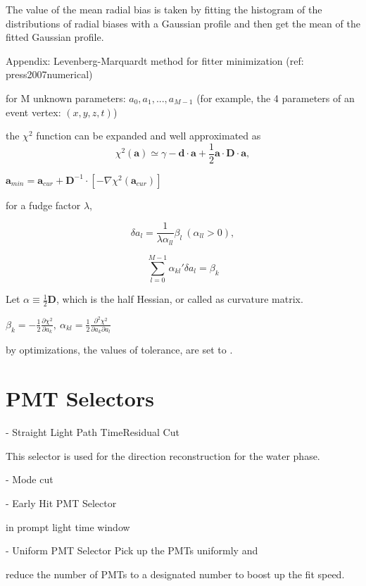 The value of the mean radial bias is taken by fitting the histogram of the distributions of radial biases with a Gaussian profile and then get the mean of the fitted Gaussian profile.







Appendix: Levenberg-Marquardt method for fitter minimization
(ref: press2007numerical)

for M unknown parameters: $a_0, a_1, ... , a_{M-1}$ (for example, the 4 parameters of an event vertex: $(x,y,z,t)$)

the $\chi^2$ function can be expanded and well approximated as
\[
\chi^2(\textbf{a})\simeq \gamma - \textbf{d}\cdot\textbf{a}+\frac{1}{2}\textbf{a}\cdot \textbf{D}\cdot \textbf{a},
\]



$\textbf{a}_{min} = \textbf{a}_{cur}+\textbf{D}^{-1}\cdot[-\nabla \chi^2(\textbf{a}_{cur})]$

for a fudge factor $\lambda$, 

\[
\delta a_l = \frac{1}{\lambda \alpha_{ll}}\beta_l~(\alpha_{ll}>0),
\]

\[
\sum_{l=0}^{M-1} \alpha_{kl}'\delta a_l = \beta_k
\]

Let $\alpha\equiv\frac{1}{2}\textbf{D}$, which is the half Hessian, or called as curvature matrix.

$\beta_k = -\frac{1}{2}\frac{\partial\chi^2}{\partial a_k},~\alpha_{kl}=\frac{1}{2}\frac{\partial^2 \chi^2}{\partial a_k\partial a_l}$

by optimizations, the values of tolerance, are set to .



\section{PMT Selectors}
- Straight Light Path TimeResidual Cut

This selector is used for the direction reconstruction for the water phase.

- Mode cut



- Early Hit PMT Selector

in prompt light time window



- Uniform PMT Selector
Pick up the PMTs uniformly and

reduce the number of PMTs to a designated number to boost up the fit speed.





